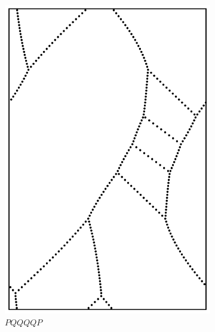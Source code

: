 \documentclass[12pt,twoside]{reedthesis}
\theoremstyle{definition}
\begin{document}
\begin{figure}[h]
\begin{subfigure}[t]{0.24\textwidth}
    \includegraphics[width=\textwidth]{figures/string_cheese_appendix/pqqqqp.pdf}
    \caption*{$PQQQQP$}
    \vspace{5mm}
  \end{subfigure}
  \hfill
  \begin{subfigure}[t]{0.24\textwidth}

\end{subfigure}
\end{figure}
\end{document}
